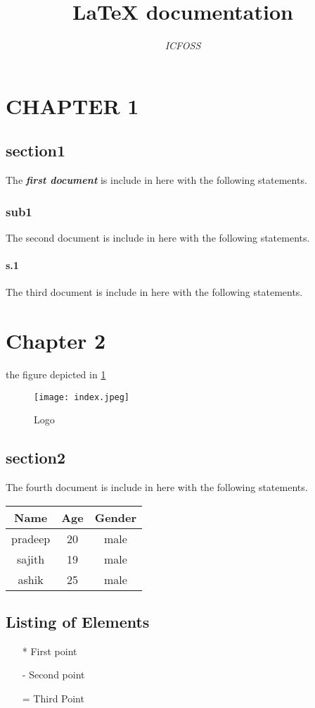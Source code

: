 \documentclass[13pt]{report} %
\begin{document}
\title{\textbf{ LaTeX documentation}}
\author{\textit{ ICFOSS}}
\maketitle
\chapter*{CHAPTER 1}

\section*{section1}
The \textbf{\textit{first document}} is include in here with the following statements.
\subsection*{sub1}The second document is include in here with the following statements.
\subsubsection*{s.1} 
The third document is include in here with the following statements.
\chapter*{Chapter 2}
the figure depicted in \ref{f:1}

\begin{figure}[H]
\centering   %
\texttt{[image: index.jpeg]}
\caption{Logo} %
\label{f:1}
\end{figure}
 
\section*{section2}
The fourth document is include in here with the following statements.

\begin{center}
\begin{tabular}{|      c      |      c      |      c      |}
\hline
Name & Age & Gender \\
\hline
pradeep & 20 & male\\
\hline
sajith & 19 & male \\
\hline
ashik & 25 & male \\
\hline
\end{tabular}
\end{center}

\section{Listing of Elements}
\begin{itemize}
\item [*]First point
\item[-] Second point
\item[=] Third Point
\end{itemize}
\end{document}
